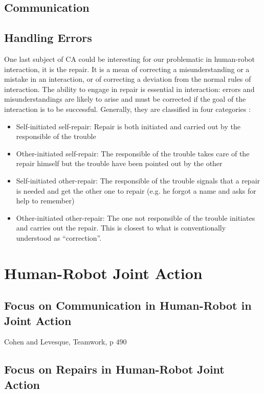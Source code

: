 \documentclass[a4paper,11pt,twoside]{StyleThese}
\begin{document}
\subsection{Communication}

\subsection{Handling Errors}

One last subject of CA could be interesting for our problematic in human-robot interaction, it is the repair. It is a mean of correcting a misunderstanding or a mistake in an interaction, or of correcting a deviation from the normal rules of interaction. The ability to engage in repair is essential in interaction: errors and misunderstandings are likely to arise and must be corrected if the  goal of the interaction is to be successful. Generally, they are classified in four categories \cite{schegloff_1977_preference,wooffitt_2008_conversation}:
\begin{itemize}
	\item Self-initiated self-repair: Repair is both initiated and carried out by the responsible of the trouble
	\item Other-initiated self-repair: The responsible of the trouble takes care of the repair himself but the trouble have been pointed out by the other
	\item Self-initiated other-repair: The responsible of the trouble signals that a repair is needed and get the other one to repair (e.g. he forgot a name and asks for help to remember)
	\item Other-initiated other-repair: The one not responsible of the trouble initiates and carries out the repair. This is closest to what is conventionally understood as ``correction''.
\end{itemize}

\section{Human-Robot Joint Action}


\subsection{Focus on Communication in Human-Robot in Joint Action}

Cohen and Levesque, Teamwork, p 490

\subsection{Focus on Repairs in Human-Robot Joint Action}
\end{document}
